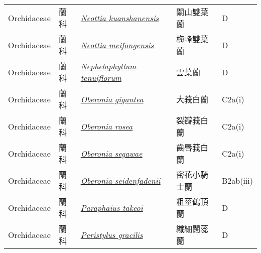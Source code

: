 {\begin{longtable}{L{2.5cm}L{2cm}L{5cm}L{2.5cm}L{3cm}}
    Orchidaceae & 蘭科 & \href{http://www.theplantlist.org/tpl1.1/search?q=Neottia+kuanshanensis}{\textit{Neottia kuanshanensis} } & 關山雙葉蘭 & D    \\
    Orchidaceae & 蘭科 & \href{http://www.theplantlist.org/tpl1.1/search?q=Neottia+meifongensis}{\textit{Neottia meifongensis} } & 梅峰雙葉蘭 & D    \\
    Orchidaceae & 蘭科 & \href{http://www.theplantlist.org/tpl1.1/search?q=Nephelaphyllum+tenuiflorum}{\textit{Nephelaphyllum tenuiflorum} } & 雲葉蘭 & D    \\
    Orchidaceae & 蘭科 & \href{http://www.theplantlist.org/tpl1.1/search?q=Oberonia+gigantea}{\textit{Oberonia gigantea} } & 大莪白蘭 & C2a(i)    \\
    Orchidaceae & 蘭科 & \href{http://www.theplantlist.org/tpl1.1/search?q=Oberonia+rosea}{\textit{Oberonia rosea} } & 裂瓣莪白蘭 & C2a(i)    \\
    Orchidaceae & 蘭科 & \href{http://www.theplantlist.org/tpl1.1/search?q=Oberonia+segawae}{\textit{Oberonia segawae} } & 齒唇莪白蘭 & C2a(i)    \\
    Orchidaceae & 蘭科 & \href{http://www.theplantlist.org/tpl1.1/search?q=Oberonia+seidenfadenii}{\textit{Oberonia seidenfadenii} } & 密花小騎士蘭 & B2ab(iii)    \\
    Orchidaceae & 蘭科 & \href{http://www.theplantlist.org/tpl1.1/search?q=Paraphaius+takeoi}{\textit{Paraphaius takeoi} } & 粗莖鶴頂蘭 & D    \\
    Orchidaceae & 蘭科 & \href{http://www.theplantlist.org/tpl1.1/search?q=Peristylus+gracilis}{\textit{Peristylus gracilis} } & 纖細闊蕊蘭 & D    \\

\end{longtable}}

